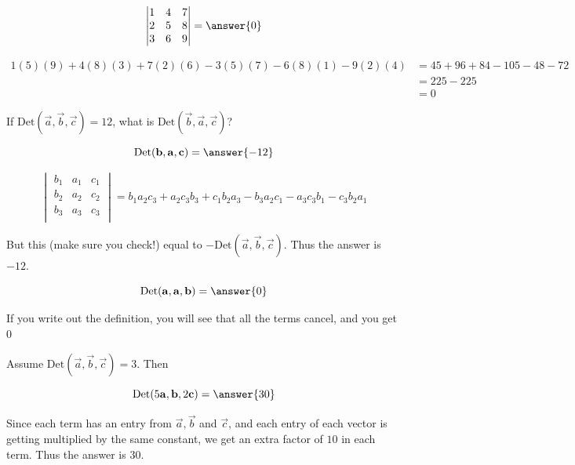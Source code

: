 \documentclass{ximera}
\begin{document}
	\begin{question}
		\[
	\begin{vmatrix} 
	1 & 4 & 7\\
	2 & 5 & 8\\
	3 & 6 & 9\\
	\end{vmatrix}
	= \answer{0}
		\]
		
		\begin{hint}
			\begin{align*}
			1(5)(9)+4(8)(3)+7(2)(6) - 3(5)(7) - 6(8)(1)-9(2)(4) &= 45+96+84-105-48-72\\
			&=225-225\\
			&=0
			\end{align*}
		\end{hint}
	\end{question}
	
	\begin{question}
		If $\textrm{Det}(\vec{a},\vec{b},\vec{c}) = 12$, what is $\textrm{Det}(\vec{b},\vec{a},\vec{c})$?
		
		\[
		\textrm{Det}(\vec{b},\vec{a},\vec{c}) = \answer{-12}
		\]
		
		\begin{hint}
	\[\begin{vmatrix} 
	b_1 & a_1 & c_1\\
	b_2 & a_2 & c_2\\
	b_3 & a_3 & c_3\\
	\end{vmatrix}
	=b_1a_2c_3+a_2c_3b_3+c_1b_2a_3-b_3a_2c_1-a_3c_3b_1-c_3b_2a_1
	\]
	
	But this (make sure you check!) equal to $-\textrm{Det}(\vec{a},\vec{b},\vec{c})$.  Thus the answer is $-12$.
		\end{hint}
	\end{question}
	
	\begin{question}
		\[
		\textrm{Det}(\vec{a},\vec{a},\vec{b}) = \answer{0}
		\]
		
		\begin{hint}
			If you write out the definition, you will see that all the terms cancel, and you get $0$
		\end{hint}
	\end{question}
	
	\begin{question}
		Assume $\textrm{Det}(\vec{a},\vec{b},\vec{c}) = 3$.  Then 
		
		\[
		\textrm{Det}(5\vec{a},\vec{b},2\vec{c}) = \answer{30}
		\]
		
		\begin{hint}
			Since each term has an entry from $\vec{a},\vec{b}$ and $\vec{c}$, and each entry of each vector is getting multiplied by the same constant, we get an extra factor of $10$ in each term.  Thus the answer is $30$.
		\end{hint}
	\end{question}
	
\end{document}
